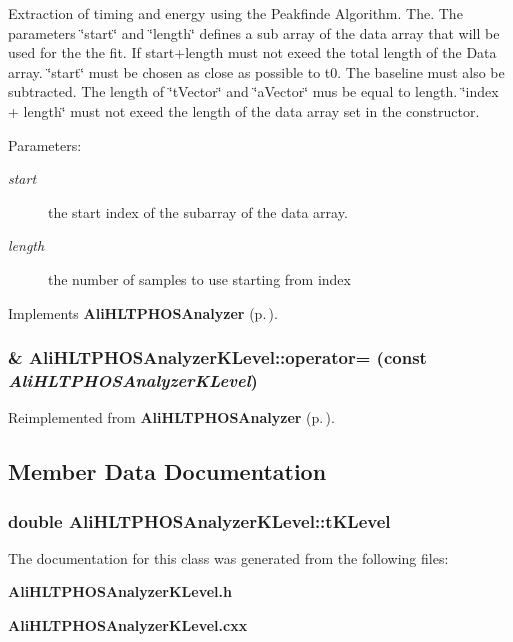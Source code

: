 Extraction of timing and energy using the Peakfinde Algorithm. The. The parameters \char`\"{}start\char`\"{} and \char`\"{}length\char`\"{} defines a sub array of the data array that will be used for the the fit. If start+length must not exeed the total length of the Data array. \char`\"{}start\char`\"{} must be chosen as close as possible to t0. The baseline must also be subtracted. The length of \char`\"{}t\-Vector\char`\"{} and \char`\"{}a\-Vector\char`\"{} mus be equal to length. \char`\"{}index + length\char`\"{} must not exeed the length of the data array set in the constructor. \begin{Desc}
\item[Parameters:]
\begin{description}
\item[{\em start}]the start index of the subarray of the data array. \item[{\em length}]the number of samples to use starting from index \end{description}
\end{Desc}


Implements {\bf Ali\-HLTPHOSAnalyzer} {\rm (p.\,\pageref{classAliHLTPHOSAnalyzer_a14})}.
\subsubsection{\& Ali\-HLTPHOSAnalyzer\-KLevel::operator= (const  {\em Ali\-HLTPHOSAnalyzer\-KLevel})\hspace{0.3cm}{\tt  [inline]}}\label{classAliHLTPHOSAnalyzerKLevel_a2}




Reimplemented from {\bf Ali\-HLTPHOSAnalyzer} {\rm (p.\,\pageref{classAliHLTPHOSAnalyzer_a4})}.

\subsection{Member Data Documentation}
\subsubsection{\setlength{\rightskip}{0pt plus 5cm}double {\bf Ali\-HLTPHOSAnalyzer\-KLevel::t\-KLevel}\hspace{0.3cm}{\tt  [private]}}\label{classAliHLTPHOSAnalyzerKLevel_r0}




The documentation for this class was generated from the following files:\begin{CompactItemize}
\item 
{\bf Ali\-HLTPHOSAnalyzer\-KLevel.h}\item 
{\bf Ali\-HLTPHOSAnalyzer\-KLevel.cxx}\end{CompactItemize}
